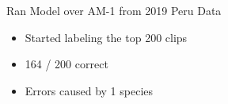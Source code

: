 




\begin{frame}{Ran Model over AM-1 from 2019 Peru Data}
    \begin{itemize}
        \item Started labeling the top 200 clips
        \item 164 / 200 correct
        \item Errors caused by 1 species
    \end{itemize}
\end{frame}

